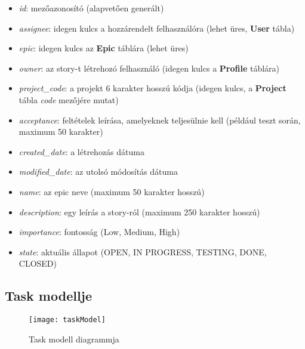 \begin{itemize}
	\item \textit{id}: mezőazonosító (alapvetően generált)
	\item \textit{assignee}: idegen kulcs a hozzárendelt felhasználóra (lehet üres, \textbf{User} tábla)
	\item \textit{epic}: idegen kulcs az \textbf{Epic} táblára (lehet üres)
	\item \textit{owner}: az story-t létrehozó felhasználó (idegen kulcs a \textbf{Profile} táblára)
	\item \textit{project\_code}: a projekt 6 karakter hosszú kódja (idegen kulcs, a \textbf{Project} tábla \textit{code} mezőjére mutat)
	\item \textit{acceptance}: feltételek leírása, amelyeknek teljesülnie kell (például teszt során, maximum 50 karakter)
	\item \textit{created\_date}: a létrehozás dátuma
	\item \textit{modified\_date}: az utolsó módosítás dátuma
	\item \textit{name}: az epic neve (maximum 50 karakter hosszú)
	\item \textit{description}: egy leírás a story-ról (maximum 250 karakter hosszú)
	\item \textit{importance}: fontosság (Low, Medium, High)
	\item \textit{state}: aktuális állapot (OPEN, IN PROGRESS, TESTING, DONE, CLOSED)
\end{itemize}

\subsection{Task modellje}

\begin{figure}[H]
	\centering
	\texttt{[image: taskModel]}
	\caption{Task modell diagrammja}
	\label{fig:taskmodel}
\end{figure}

